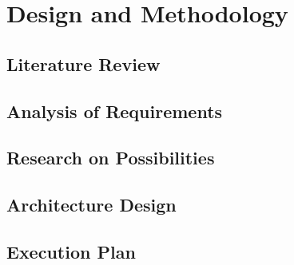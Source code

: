\chapter{Design and Methodology}

\section{Literature Review}

\section{Analysis of Requirements}

\section{Research on Possibilities}

\section{Architecture Design}

\section{Execution Plan}
